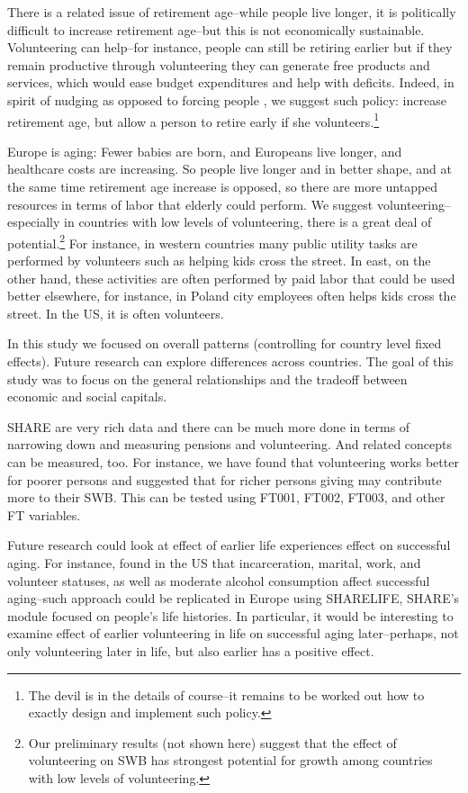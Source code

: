 \documentclass[10pt, letterpaper]{article}
\begin{document}
\begin{spacing}{1.4}
There is a related issue of retirement age--while people live longer, it is
 politically difficult to increase retirement age--but this is not economically
 sustainable. Volunteering can help--for instance, people can still be retiring
 earlier but if they remain productive through volunteering they can generate
 free products and services, which would ease budget expenditures and help with
 deficits. Indeed, in spirit of nudging as opposed to forcing people
 \citep{thaler08}, we suggest such policy: increase retirement age, but allow a
 person to retire early if she volunteers.\footnote{The devil is in the details
   of course--it remains to be worked out how to exactly design and implement
   such policy.}

Europe is aging: Fewer babies are born, and Europeans live longer, and healthcare
costs are increasing. So people live longer and in better shape, and at the same
time retirement age increase is opposed, so there are more untapped resources in
terms of labor that elderly could perform. We suggest volunteering--especially
in countries with low levels of volunteering, there is a great deal of
potential.\footnote{Our preliminary results (not shown here) suggest that the
  effect of volunteering on SWB has strongest potential for growth among
  countries with low levels of volunteering.}  
%
%
 For instance, in western countries many public utility tasks are performed by volunteers such
as helping kids cross the street. In east, on the other hand, these activities
are often performed by paid labor that could be used better elsewhere, for
instance, in Poland %
 city employees often helps kids cross the street. %
 In the US, it is often volunteers.

In this study we focused on overall patterns (controlling for country level fixed
effects). Future research can explore differences across countries. 
%
The goal of this study was to focus on the general relationships and the tradeoff
between economic and social capitals.

SHARE are very rich data and there can be much more done in terms of narrowing
down and measuring pensions and volunteering. And related concepts can be
measured, too. For instance, we have found that volunteering works better for
poorer persons and suggested that for richer persons giving may contribute more
to their SWB. This can be tested using FT001, FT002, FT003, and other FT
variables.  



Future research could look at effect of earlier life experiences effect on successful
aging. For instance, \citet{pruchno2010successful,pruchno2010two} found in the US that incarceration,
 marital, work, and volunteer statuses, as well as moderate
alcohol consumption affect successful aging--such approach could be
replicated in Europe using SHARELIFE, SHARE's module focused on people's life
histories. In particular, it would be interesting to examine effect of earlier
volunteering in life on successful aging later--perhaps, not only
volunteering later in life, but also earlier has a positive effect. 


\end{spacing}
\end{document}
